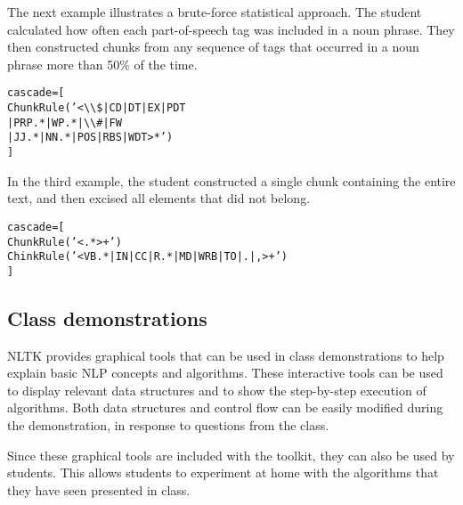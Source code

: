 \documentclass[11pt]{article}
\newenvironment{sv}{\scriptsize\begin{alltt}}{\end{alltt}\normalsize}
\begin{document}
The next example illustrates a brute-force statistical approach.  The
student calculated how often each part-of-speech tag was included in a
noun phrase.  They then constructed chunks from any sequence of tags
that occurred in a noun phrase more than 50\% of the time.

\begin{sv}
cascade = [
  ChunkRule('<{\textbackslash}{\textbackslash}\$|CD|DT|EX|PDT
             |PRP.*|WP.*|{\textbackslash}{\textbackslash}\#|FW
             |JJ.*|NN.*|POS|RBS|WDT>*')
]
\end{sv}

In the third example, the student constructed a single chunk
containing the entire text, and then excised all elements that did not
belong.

\begin{sv}
cascade = [
  ChunkRule('<.*>+')
  ChinkRule('<VB.*|IN|CC|R.*|MD|WRB|TO|.|,>+')
]
\end{sv}


%

\subsection{Class demonstrations}

NLTK provides graphical tools that can be used in class demonstrations
to help explain basic NLP concepts and algorithms.  These interactive
tools can be used to display relevant data structures and to show the
step-by-step execution of algorithms.  Both data structures and
control flow can be easily modified during the demonstration, in
response to questions from the class.

Since these graphical tools are included with the toolkit, they can
also be used by students.  This allows students to experiment at home
with the algorithms that they have seen presented in class.
\end{document}
